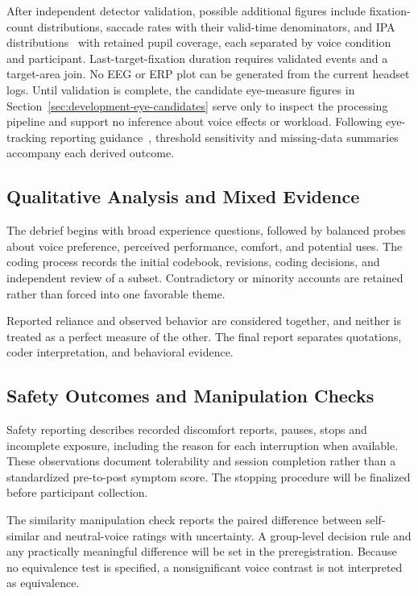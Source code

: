 After independent detector validation, possible additional figures include fixation-count distributions, saccade rates with their valid-time denominators, and IPA distributions~\cite{duchowski2018ipa} with retained pupil coverage, each separated by voice condition and participant. Last-target-fixation duration requires validated events and a target-area join. No EEG or ERP plot can be generated from the current headset logs. Until validation is complete, the candidate eye-measure figures in Section~\ref{sec:development-eye-candidates} serve only to inspect the processing pipeline and support no inference about voice effects or workload. Following eye-tracking reporting guidance~\cite{dunn2024reporting}, threshold sensitivity and missing-data summaries accompany each derived outcome.

\subsection{Qualitative Analysis and Mixed Evidence}
The debrief begins with broad experience questions, followed by balanced probes about voice preference, perceived performance, comfort, and potential uses. The coding process records the initial codebook, revisions, coding decisions, and independent review of a subset. Contradictory or minority accounts are retained rather than forced into one favorable theme.

Reported reliance and observed behavior are considered together, and neither is treated as a perfect measure of the other. The final report separates quotations, coder interpretation, and behavioral evidence.

\subsection{Safety Outcomes and Manipulation Checks}
Safety reporting describes recorded discomfort reports, pauses, stops and incomplete exposure, including the reason for each interruption when available. These observations document tolerability and session completion rather than a standardized pre-to-post symptom score. The stopping procedure will be finalized before participant collection.

The similarity manipulation check reports the paired difference between self-similar and neutral-voice ratings with uncertainty. A group-level decision rule and any practically meaningful difference will be set in the preregistration. Because no equivalence test is specified, a nonsignificant voice contrast is not interpreted as equivalence.
